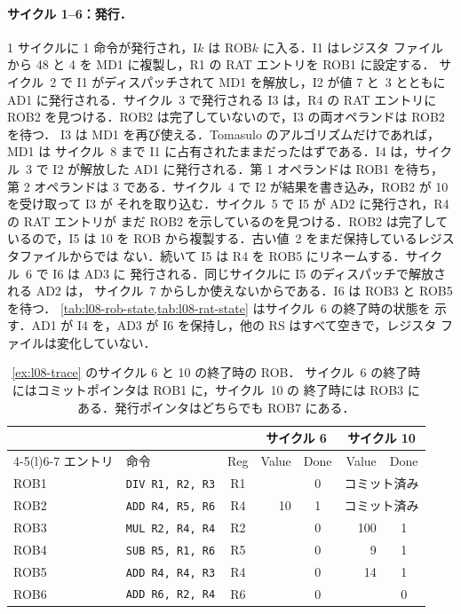 \documentclass[../main.tex]{subfiles}
\begin{document}
\paragraph{サイクル 1--6：発行．}
1 サイクルに 1 命令が発行され，I$k$ は ROB$k$ に入る．I1 はレジスタ
ファイルから 48 と 4 を MD1 に複製し，R1 の RAT エントリを ROB1 に設定する．
サイクル~2 で I1 がディスパッチされて MD1 を解放し，I2 が値 7 と~3 とともに
AD1 に発行される．サイクル~3 で発行される I3 は，R4 の RAT エントリに ROB2
を見つける．ROB2 は完了していないので，I3 の両オペランドは ROB2 を待つ．
I3 は MD1 を再び使える．Tomasulo のアルゴリズムだけであれば，MD1 は
サイクル~8 まで I1 に占有されたままだったはずである．I4 は，サイクル~3 で
I2 が解放した AD1 に発行される．第 1 オペランドは ROB1 を待ち，第 2 オペランドは 3
である．サイクル~4 で I2 が結果を書き込み，ROB2 が 10 を受け取って I3 が
それを取り込む．サイクル~5 で I5 が AD2 に発行され，R4 の RAT エントリが
まだ ROB2 を示しているのを見つける．ROB2 は完了しているので，I5 は 10 を
ROB から複製する．古い値~2 をまだ保持しているレジスタファイルからでは
ない．続いて I5 は R4 を ROB5 にリネームする．サイクル~6 で I6 は AD3 に
発行される．同じサイクルに I5 のディスパッチで解放される AD2 は，
サイクル~7 からしか使えないからである．I6 は ROB3 と ROB5 を待つ．
\cref{tab:l08-rob-state,tab:l08-rat-state} はサイクル~6 の終了時の状態を
示す．AD1 が I4 を，AD3 が I6 を保持し，他の RS はすべて空きで，レジスタ
ファイルは変化していない．

\begin{table}[htbp]
  \centering\small
  \caption{\cref{ex:l08-trace} のサイクル 6 と 10 の終了時の ROB．
    サイクル~6 の終了時にはコミットポインタは ROB1 に，サイクル~10 の
    終了時には ROB3 にある．発行ポインタはどちらでも ROB7 にある．}
  \label{tab:l08-rob-state}
  \begin{tabular}{@{}llcrcrc@{}}
    \toprule
    & & & \multicolumn{2}{c}{サイクル 6} & \multicolumn{2}{c}{サイクル 10} \\
    \cmidrule(lr){4-5}\cmidrule(l){6-7}
    エントリ & 命令 & Reg & Value & Done & Value & Done \\
    \midrule
    ROB1 & \texttt{DIV R1, R2, R3} & R1 &     & 0 & \multicolumn{2}{c}{コミット済み} \\
    ROB2 & \texttt{ADD R4, R5, R6} & R4 & 10  & 1 & \multicolumn{2}{c}{コミット済み} \\
    ROB3 & \texttt{MUL R2, R4, R4} & R2 &     & 0 & 100 & 1 \\
    ROB4 & \texttt{SUB R5, R1, R6} & R5 &     & 0 & 9   & 1 \\
    ROB5 & \texttt{ADD R4, R4, R3} & R4 &     & 0 & 14  & 1 \\
    ROB6 & \texttt{ADD R6, R2, R4} & R6 &     & 0 &     & 0 \\
    \bottomrule
  \end{tabular}
\end{table}
\end{document}
